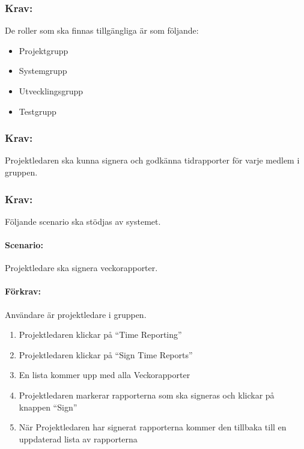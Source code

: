 \documentclass[paper=a4, fontsize=11pt,twoside]{article}
\begin{document}
\paragraph{}
\newpage
\subsubsection{Krav:}
De roller som ska finnas tillgängliga är som följande:
\begin{itemize}
\item Projektgrupp
\item Systemgrupp
\item Utvecklingsgrupp
\item Testgrupp
\end{itemize}

\paragraph{}
\subsubsection{Krav:}
Projektledaren ska kunna signera och godkänna tidrapporter för varje medlem i gruppen.

\paragraph{}

\subsubsection{Krav:}
Följande scenario ska stödjas av systemet.
\paragraph{Scenario:}
Projektledare ska signera veckorapporter.
\paragraph{Förkrav:}
Användare är projektledare i gruppen.
\begin{enumerate}
\item Projektledaren klickar på “Time Reporting”
\item Projektledaren klickar på “Sign Time Reports”
\item En lista kommer upp med alla Veckorapporter
\item Projektledaren markerar rapporterna som ska signeras och klickar på knappen “Sign”
\item När Projektledaren har signerat rapporterna kommer den tillbaka till en uppdaterad lista av rapporterna
\end{enumerate}
\end{document}

